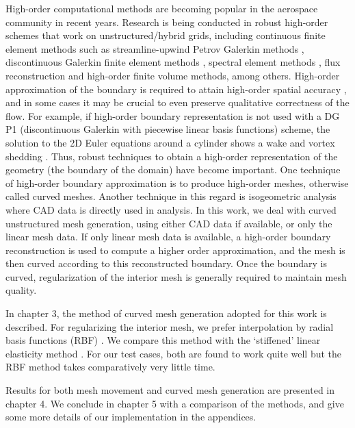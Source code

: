 High-order computational methods are becoming popular in the aerospace community in recent years. Research is being conducted in robust high-order schemes that work on unstructured/hybrid grids, including continuous finite element methods such as streamline-upwind Petrov Galerkin methods \cite{appl:supg}, discontinuous Galerkin finite element methods \cite{solver, curve:hartmann, appl:mavriplis}, spectral element methods \cite{appl:spectral}, flux reconstruction \cite{appl:fr} and high-order finite volume methods, among others. High-order approximation of the boundary is required to attain high-order spatial accuracy \cite{curve:geomacc}, and in some cases it may be crucial to even preserve qualitative correctness of the flow. For example, if high-order boundary representation is not used with a DG P1 (discontinuous Galerkin with piecewise linear basis functions) scheme, the solution to the 2D Euler equations around a cylinder shows a wake and vortex shedding \cite{appl:dgeuler}. Thus, robust techniques to obtain a high-order representation of the geometry (the boundary of the domain) have become important.  One technique of high-order boundary approximation is to produce high-order meshes, otherwise called curved meshes. Another technique in this regard is isogeometric analysis \cite{isogeometric} where CAD data is directly used in analysis. In this work, we deal with curved unstructured mesh generation, using either CAD data if available, or only the linear mesh data. If only linear mesh data is available, a high-order boundary reconstruction is used to compute a higher order approximation, and the mesh is then curved according to this reconstructed boundary. Once the boundary is curved, regularization of the interior mesh is generally required to maintain mesh quality.

In chapter 3, the method of curved mesh generation adopted for this work is described. For regularizing the interior mesh, we prefer interpolation by radial basis functions (RBF) \cite{rbf:errorwendland}. We compare this method with the `stiffened' linear elasticity method \cite{mm:fsielast}. For our test cases, both are found to work quite well but the RBF method takes comparatively very little time.

Results for both mesh movement and curved mesh generation are presented in chapter 4. We conclude in chapter 5 with a comparison of the methods, and give some more details of our implementation in the appendices.
